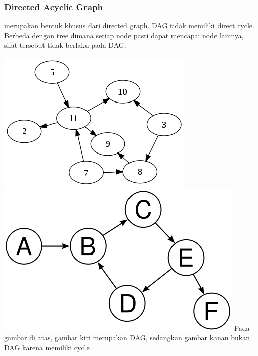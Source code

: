 \begin{frame}
\frametitle{Directed Acyclic Graph}
 merupakan bentuk khusus dari directed graph. DAG tidak memiliki direct cycle. Berbeda dengan tree dimana setiap node pasti dapat mencapai node lainnya, sifat tersebut tidak berlaku pada DAG.

\includegraphics[width=4 cm]{asset/dag.png}
\hspace{\fill}
\includegraphics[width=4 cm]{asset/not-dag.png}
\newline\newline
Pada gambar di atas, gambar kiri merupakan DAG, sedangkan gambar kanan bukan DAG karena memiliki cycle
\end{frame}


